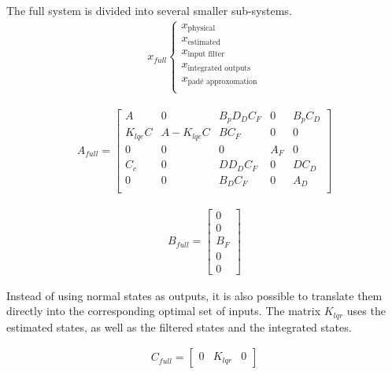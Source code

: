 The full system is divided into several smaller sub-systems. 
\begin{align}
    x_{full}
    \begin{cases}
        x_{\text{physical}}\\
        x_{\text{estimated}} \\
        x_{\text{input filter}}\\
        x_{\text{integrated outputs}}\\
        x_{\text{padé approxomation}}\\
    \end{cases}
\end{align}

\begin{align}
    A_{full} 
    = 
    \begin{bmatrix}
        A        & 0            & B_p D_D C_{F} & 0   & B_p C_D          \\
        K_{lqe}C & A - K_{lqe}C & B C_F         & 0   & 0           \\
        0        & 0            & 0             & A_F & 0         \\
        C_c      & 0            & D D_D C_F     & 0   & D C_D   \\
        0        & 0            & B_D C_F       & 0   & A_D   \\
    \end{bmatrix}
\end{align}

\begin{align}
    B_{full}   =
    \begin{bmatrix}
        0 \\
        0 \\
        B_F \\
        0 \\
        0
    \end{bmatrix}
\end{align}

Instead of using normal states as outputs, it is also possible to translate them directly into the corresponding optimal set of inputs. The matrix $K_{lqr}$ uses the estimated states, as well as the filtered states and the integrated states. 

\begin{align}
    C_{full} = 
    \begin{bmatrix}
        0 & K_{lqr} & 0
    \end{bmatrix}
\end{align}

